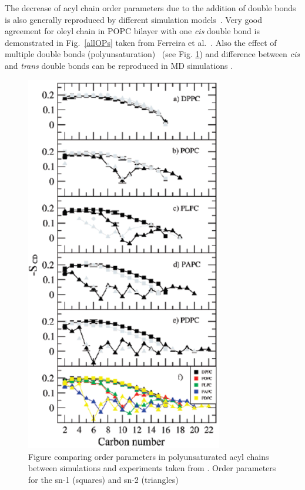 \documentclass[aps,prl,superscriptaddress,twocolumn]{revtex4}
\begin{document}
The decrease of acyl chain order parameters due to the addition of double bonds is also 
generally reproduced by different simulation 
models~\cite{hyvonen97,hyvonen97b,feller97,saiz01,huber02,feller02,bachar04,rog04,hyvonen05,ollila07a,dickson12,klauda10,klauda12,ferreira13,jambeck13,lee14,dickson14}. 
Very good agreement for oleyl chain in POPC bilayer with one {\it cis} double bond is demonstrated in Fig.~\ref{allOPs} 
taken from Ferreira et al.~\cite{ferreira13}.
Also the effect of multiple double bonds (polyunsaturation)~\cite{hyvonen97,hyvonen97b,saiz01,huber02,feller02,bachar04,hyvonen05,ollila07a,klauda12} (see Fig. \ref{polyunsat})
and difference between {\it cis} and {\it trans} double bonds can be reproduced in MD simulations \cite{kulig15b}.
\begin{figure}[]
  \includegraphics[width=8.6cm]{../Fig/polyunsat.eps}
\newline
  \caption{\label{polyunsat}
   Figure comparing order parameters in polyunsaturated acyl chains between simulations and 
   experiments taken from \cite{ollila07a}.
   Order parameters for the sn-1 (squares) and sn-2 (triangles)
}
\end{figure}
\end{document}
